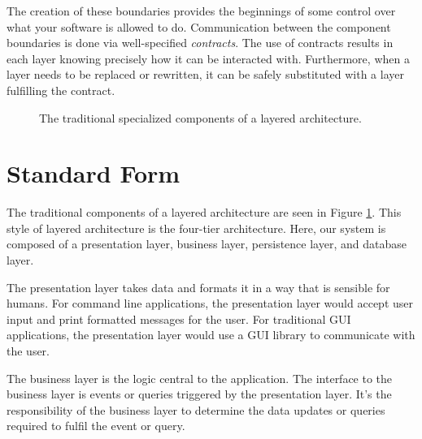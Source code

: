 The creation of these boundaries provides the beginnings of some control over what your software is allowed to do.
Communication between the component boundaries is done via well-specified \textsl{contracts}.
The use of contracts results in each layer knowing precisely how it can be interacted with.
Furthermore, when a layer needs to be replaced or rewritten, it can be safely substituted with a layer fulfilling the contract.


\begin{figure}[ht]
\centering
{}
\caption{The traditional specialized components of a layered architecture.}
\label{fig:traditional-layered}
\end{figure}

\section{Standard Form}

The traditional components of a layered architecture are seen in Figure \ref{fig:traditional-layered}.
This style of layered architecture is the four-tier architecture.
Here, our system is composed of a presentation layer, business layer, persistence layer, and database layer.

The presentation layer takes data and formats it in a way that is sensible for humans.
For command line applications, the presentation layer would accept user input and print formatted messages for the user.
For traditional GUI applications, the presentation layer would use a GUI library to communicate with the user.

The business layer is the logic central to the application.
The interface to the business layer is events or queries triggered by the presentation layer.
It's the responsibility of the business layer to determine the data updates or queries required to fulfil the event or query.

